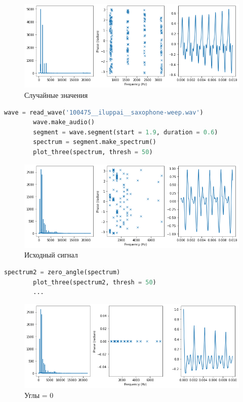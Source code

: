 \documentclass[a4paper, 12pt]{report}
\begin{document}
	\begin{figure}[H]
		\centering
		\includegraphics[width=1.0\textwidth]{test11.png}
		\caption{Случайные значения}
		\label{fig:test11}
	\end{figure}
	\begin{lstlisting}[language=Python,caption=Возьмём другой сигнал]
		wave = read_wave('100475__iluppai__saxophone-weep.wav')
		wave.make_audio()
		segment = wave.segment(start = 1.9, duration = 0.6)
		spectrum = segment.make_spectrum()
		plot_three(spectrum, thresh = 50)
	\end{lstlisting}
	\begin{figure}[H]
		\centering
		\includegraphics[width=1.0\textwidth]{test12.png}
		\caption{Исходный сигнал}
		\label{fig:test12}
	\end{figure}
	\begin{lstlisting}[language=Python,caption=Применение функций для другого сигнала]
		spectrum2 = zero_angle(spectrum)
		plot_three(spectrum2, thresh = 50)
		...
	\end{lstlisting}
	\begin{figure}[H]
		\centering
		\includegraphics[width=1.0\textwidth]{test13.png}
		\caption{Углы = 0}
		\label{fig:test13}
	\end{figure}
\end{document}

